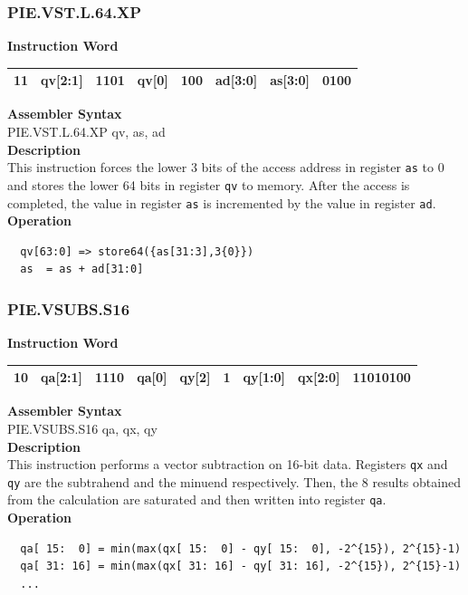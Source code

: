 \newpage
\subsubsection{PIE.VST.L.64.XP}\label{instruction:PIEVSTL64XP}
\setlength\tabcolsep{6pt}
\textbf{Instruction Word} \\
\begin{tabular}{|c|c|c|c|c|c|c|c|}
	\hline
	11 & qv[2:1] & 1101 & qv[0] & 100 & ad[3:0] & as[3:0] & 0100 \\
	\hline
\end{tabular}

\textbf{Assembler Syntax} \\
PIE.VST.L.64.XP qv, as, ad \\
\textbf{Description} \\
This instruction forces the lower 3 bits of the access address in register \lstinline{as} to 0 and stores the lower 64 bits in register \lstinline{qv} to memory. After the access is completed, the value in register \lstinline{as} is incremented by the value in register \lstinline{ad}.\\
\textbf{Operation}
\begin{lstlisting}
  qv[63:0] => store64({as[31:3],3{0}})
  as  = as + ad[31:0]
\end{lstlisting}

\newpage
\subsubsection{PIE.VSUBS.S16}\label{instruction:PIEVSUBSS16}
\setlength\tabcolsep{6pt}
\textbf{Instruction Word} \\
\begin{tabular}{|c|c|c|c|c|c|c|c|c|}
	\hline
	10 & qa[2:1] & 1110 & qa[0] & qy[2] & 1 & qy[1:0] & qx[2:0] & 11010100 \\
	\hline
\end{tabular}

\textbf{Assembler Syntax} \\
PIE.VSUBS.S16 qa, qx, qy \\
\textbf{Description} \\
This instruction performs a vector subtraction on 16-bit data. Registers \lstinline{qx} and \lstinline{qy} are the subtrahend and the minuend respectively. Then, the 8 results obtained from the calculation are saturated and then written into register \lstinline{qa}.\\
\textbf{Operation}
\begin{lstlisting}
  qa[ 15:  0] = min(max(qx[ 15:  0] - qy[ 15:  0], -2^{15}), 2^{15}-1)
  qa[ 31: 16] = min(max(qx[ 31: 16] - qy[ 31: 16], -2^{15}), 2^{15}-1)
  ...
\end{lstlisting}

